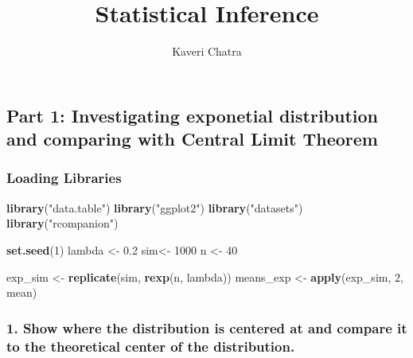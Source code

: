 \documentclass[]{article}
\title{Statistical Inference}
\author{Kaveri Chatra}
\date{}
\newenvironment{Shaded}{\begin{snugshade}}{\end{snugshade}}
\newcommand{\KeywordTok}[1]{\textcolor[rgb]{0.13,0.29,0.53}{\textbf{#1}}}
\newcommand{\DecValTok}[1]{\textcolor[rgb]{0.00,0.00,0.81}{#1}}
\newcommand{\FloatTok}[1]{\textcolor[rgb]{0.00,0.00,0.81}{#1}}
\newcommand{\StringTok}[1]{\textcolor[rgb]{0.31,0.60,0.02}{#1}}
\newcommand{\NormalTok}[1]{#1}
\begin{document}
\maketitle

\subsection{Part 1: Investigating exponetial distribution and comparing
with Central Limit
Theorem}\label{part-1-investigating-exponetial-distribution-and-comparing-with-central-limit-theorem}

\subsubsection{Loading Libraries}\label{loading-libraries}

\begin{Shaded}
\begin{Highlighting}[]
\KeywordTok{library}\NormalTok{(}\StringTok{"data.table"}\NormalTok{)}
\KeywordTok{library}\NormalTok{(}\StringTok{"ggplot2"}\NormalTok{)}
\KeywordTok{library}\NormalTok{(}\StringTok{"datasets"}\NormalTok{)}
\KeywordTok{library}\NormalTok{(}\StringTok{"rcompanion"}\NormalTok{)}
\end{Highlighting}
\end{Shaded}

\begin{Shaded}
\begin{Highlighting}[]
\KeywordTok{set.seed}\NormalTok{(}\DecValTok{1}\NormalTok{)}
\NormalTok{lambda <-}\StringTok{ }\FloatTok{0.2}
\NormalTok{sim<-}\StringTok{ }\DecValTok{1000}
\NormalTok{n <-}\StringTok{ }\DecValTok{40}


\NormalTok{exp_sim <-}\StringTok{ }\KeywordTok{replicate}\NormalTok{(sim, }\KeywordTok{rexp}\NormalTok{(n, lambda))}
\NormalTok{means_exp <-}\StringTok{ }\KeywordTok{apply}\NormalTok{(exp_sim, }\DecValTok{2}\NormalTok{, mean)}
\end{Highlighting}
\end{Shaded}

\subsubsection{1. Show where the distribution is centered at and compare
it to the theoretical center of the
distribution.}\label{show-where-the-distribution-is-centered-at-and-compare-it-to-the-theoretical-center-of-the-distribution.}
\end{document}
